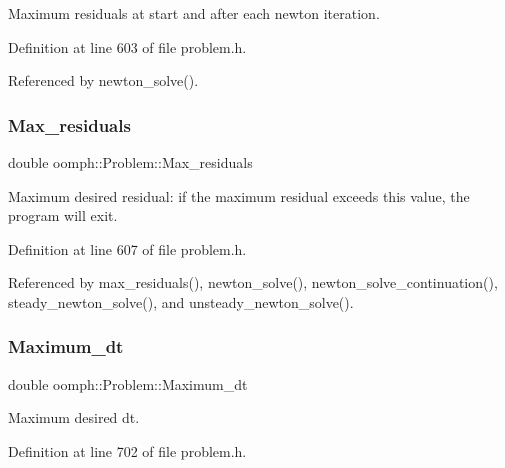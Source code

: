 Maximum residuals at start and after each newton iteration. 



Definition at line 603 of file problem.\+h.



Referenced by newton\+\_\+solve().

\mbox{\label{classoomph_1_1Problem_accb8811cdf32f14be497917e922c623e}} 
\subsubsection{\texorpdfstring{Max\+\_\+residuals}{Max\_residuals}}
{\footnotesize\ttfamily double oomph\+::\+Problem\+::\+Max\+\_\+residuals\hspace{0.3cm}{\ttfamily [protected]}}



Maximum desired residual\+: if the maximum residual exceeds this value, the program will exit. 



Definition at line 607 of file problem.\+h.



Referenced by max\+\_\+residuals(), newton\+\_\+solve(), newton\+\_\+solve\+\_\+continuation(), steady\+\_\+newton\+\_\+solve(), and unsteady\+\_\+newton\+\_\+solve().

\mbox{\label{classoomph_1_1Problem_a7b5fde48b00a7fdc5f1fbbee138d0414}} 
\subsubsection{\texorpdfstring{Maximum\+\_\+dt}{Maximum\_dt}}
{\footnotesize\ttfamily double oomph\+::\+Problem\+::\+Maximum\+\_\+dt\hspace{0.3cm}{\ttfamily [protected]}}



Maximum desired dt. 



Definition at line 702 of file problem.\+h.




